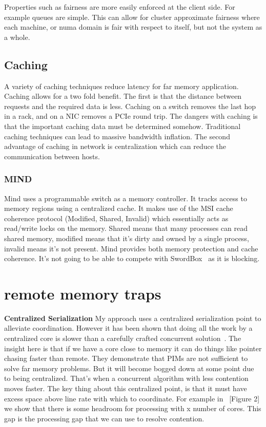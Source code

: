 Properties such as fairness are more easily enforced at the client side. For
example queues are simple. This can allow for cluster approximate fairness where
each machine, or numa domain is fair with respect to itself, but not the system
as a whole.

\subsection{Caching} A variety of caching techniques reduce latency for far memory
application. Caching allows for a two fold benefit. The first is that the
distance between requests and the required data is less. Caching on a switch
removes the last hop in a rack, and on a NIC removes a PCIe round trip. The
dangers with caching is that the important caching data must be determined
somehow. Traditional caching techniques can lead to massive bandwidth inflation.
The second advantage of caching in network is centralization which can reduce
the communication between hosts.


\subsubsection{MIND~\cite{mind}}

Mind uses a programmable switch as a memory controller. It tracks access to
memory regions using a centralized cache. It makes use of the MSI cache
coherence protocol (Modified, Shared, Invalid) which essentially acts as
read/write locks on the memory. Shared means that many processes can read shared
memory, modified means that it's dirty and owned by a single process, invalid
means it's not present. Mind provides both memory protection and cache
coherence. It's not going to be able to compete with
SwordBox~\cite{Grant2021InContRes} as it is blocking.

\section{remote memory traps}

\textbf{Centralized Serialization} My approach uses a centralized serialization
point to alleviate coordination. However it has been shown that doing all the
work by a centralized core is slower than a carefully crafted concurrent
solution~\cite{near-memory-structs}. The insight here is that if we have a core
close to memory it can do things like pointer chasing faster than remote. They
demonstrate that PIMs are not sufficient to solve far memory problems. But it
will become bogged down at some point due to being centralized. That's when a
concurrent algorithm with less contention moves faster. The key thing about this
centralized point, is that it must have excess space above line rate with which
to coordinate. For example in ~\cite{fairnic}[Figure 2] we show that there is
some headroom for processing with x number of cores. This gap is the processing
gap that we can use to resolve contention.

